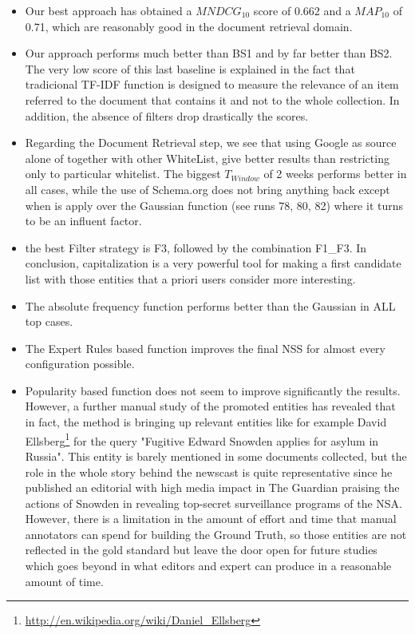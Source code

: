 \documentclass{llncs}
\begin{document}
\begin{itemize}

\item Our best approach has obtained a $MNDCG_{10}$ score of 0.662 and a $MAP_{10}$ of 0.71, which are reasonably good in the document retrieval domain.
\item Our approach performs much better than BS1 and by far better than BS2. The very low score of this last baseline is explained in the fact that tradicional TF-IDF function is designed to measure the relevance of an item referred to the document that contains it and not to the whole collection. In addition, the absence of filters drop drastically the scores.
\item Regarding the Document Retrieval step, we see that using Google as source alone of together with other WhiteList, give better results than restricting only to particular whitelist. The biggest $T_{Window}$ of 2 weeks performs better in all cases, while the use of Schema.org does not bring anything back except when is apply over the Gaussian function (see runs 78, 80, 82) where it turns to be an influent factor.
\item the best Filter strategy is F3, followed by the combination F1\_F3. In conclusion, capitalization is a very powerful tool for making a first candidate list with those entities that a priori users consider more interesting.
\item The absolute frequency function performs better than the Gaussian in ALL top cases.
\item The Expert Rules based function improves the final NSS for almost every configuration possible.
\item Popularity based function does not seem to improve significantly the results. However, a further manual study of the promoted entities has revealed that in fact, the method is bringing up relevant entities like for example David Ellsberg\footnote{\url{http://en.wikipedia.org/wiki/Daniel_Ellsberg}} for the query "Fugitive Edward Snowden applies for asylum in Russia". This entity is barely mentioned in some documents collected, but the role in the whole story behind the newscast is quite representative since he published an editorial with high media impact in The Guardian praising the actions of Snowden in revealing top-secret surveillance programs of the NSA. However, there is a limitation in the amount of effort and time that manual annotators can spend for building the Ground Truth, so those entities are not reflected in the gold standard but leave the door open for future studies which goes beyond in what editors and expert can produce in a reasonable amount of time.
\end{itemize}
\end{document}
